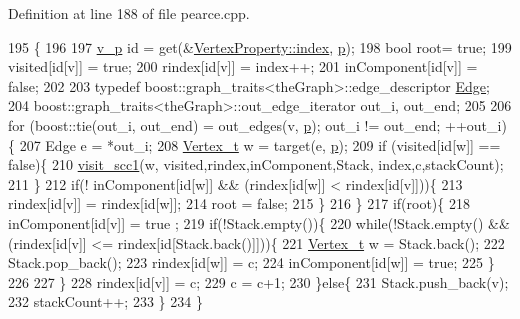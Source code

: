 Definition at line 188 of file pearce.\+cpp.


\begin{DoxyCode}
195                                         \{
196 
197     \hyperlink{utilities_8h_a3f4959b3d837fa6351a9414c79280286}{v\_p} \textcolor{keywordtype}{id} = \textcolor{keyword}{get}(&\hyperlink{struct_utility_structs_1_1_vertex_property_a636cb729438e999aa3d9a17ac39d8641}{VertexProperty::index}, \hyperlink{class_pearce_a2320928312fd97f6bcb1f16684f79a03}{p});
198     \textcolor{keywordtype}{bool} root= \textcolor{keyword}{true};
199     visited[\textcolor{keywordtype}{id}[v]] = \textcolor{keyword}{true};
200     rindex[\textcolor{keywordtype}{id}[v]] = index++;
201     inComponent[\textcolor{keywordtype}{id}[v]] = \textcolor{keyword}{false};
202 
203     \textcolor{keyword}{typedef} boost::graph\_traits<theGraph>::edge\_descriptor \hyperlink{class_graph_component_aa7517b2af08aa717324076a645c73fe6}{Edge};
204     boost::graph\_traits<theGraph>::out\_edge\_iterator out\_i, out\_end;
205 
206     \textcolor{keywordflow}{for} (boost::tie(out\_i, out\_end) = out\_edges(v, \hyperlink{class_pearce_a2320928312fd97f6bcb1f16684f79a03}{p}); out\_i != out\_end; ++out\_i)\{
207         Edge e = *out\_i;
208         \hyperlink{utilities_8h_a344cd987714d06997f0becda3c96d6e2}{Vertex\_t} w = target(e, \hyperlink{class_pearce_a2320928312fd97f6bcb1f16684f79a03}{p});
209         \textcolor{keywordflow}{if} (visited[\textcolor{keywordtype}{id}[w]] == \textcolor{keyword}{false})\{
210             \hyperlink{class_pearce_ae4e9364dd0c829564ecfbfe8ccc07b6a}{visit\_scc1}(w, visited,rindex,inComponent,Stack, index,c,stackCount);
211         \}
212         \textcolor{keywordflow}{if}(! inComponent[\textcolor{keywordtype}{id}[w]] && (rindex[\textcolor{keywordtype}{id}[w]] < rindex[\textcolor{keywordtype}{id}[v]]))\{
213             rindex[\textcolor{keywordtype}{id}[v]] = rindex[\textcolor{keywordtype}{id}[w]]; 
214             root = \textcolor{keyword}{false};
215         \}
216     \}
217     \textcolor{keywordflow}{if}(root)\{
218         inComponent[\textcolor{keywordtype}{id}[v]] = true ;
219         \textcolor{keywordflow}{if}(!Stack.empty())\{
220             \textcolor{keywordflow}{while}(!Stack.empty() && (rindex[\textcolor{keywordtype}{id}[v]] <= rindex[\textcolor{keywordtype}{id}[Stack.back()]]))\{
221                 \hyperlink{utilities_8h_a344cd987714d06997f0becda3c96d6e2}{Vertex\_t} w = Stack.back();
222                 Stack.pop\_back();
223                 rindex[\textcolor{keywordtype}{id}[w]] = c;
224                 inComponent[\textcolor{keywordtype}{id}[w]] = \textcolor{keyword}{true};
225             \}
226                  
227         \}
228         rindex[\textcolor{keywordtype}{id}[v]] = c;
229         c = c+1;
230     \}\textcolor{keywordflow}{else}\{
231         Stack.push\_back(v);
232         stackCount++;
233     \}
234 \}
\end{DoxyCode}
\mbox{\label{class_pearce_a12c836f8f0dbd85e20c0f3f4f0c5fb47}} 
